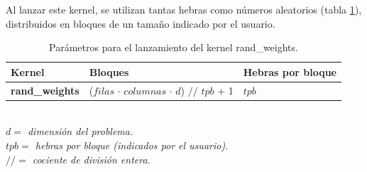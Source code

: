 Al lanzar este kernel, se utilizan tantas hebras como números aleatorios (tabla \ref{tab:randkernel}), distribuidos en bloques de un tamaño indicado por el usuario.
\begin{table}[ht]
\begin{tabular}{@{}lll@{}}
\toprule
\textbf{Kernel}        & \textbf{Bloques}                                 & \textbf{Hebras por bloque}                                                                       \\ \midrule
\textbf{rand\_weights} & ($filas$ $\cdot$ $columnas$ $\cdot$ $d$) $//$ $tpb$ + 1 & $tpb$ \\ \bottomrule
\end{tabular}

\textit{\\$d=$ dimensión del problema.\\$tpb=$ hebras por bloque (indicados por el usuario).\\ $//=$ cociente de división entera.}
\caption{Parámetros para el lanzamiento del kernel rand\_weights.}
\label{tab:randkernel}
\end{table}
\newpage

